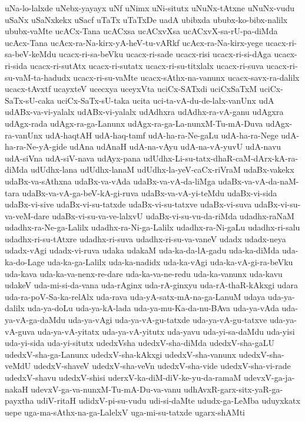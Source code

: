 {uNa-lo-lalxde
uNebx-yayayx
uNf
uNimx
uNi-situtx
uNuNx-tAtxne
uNuNx-vudu
uSaNx
uSaNxkekx
uSacf
uTaTx
uTaTxDe
uadA
ubibxda
ububx-ko-bibx-nalilx
ububx-vaMte
ucACx-Tana
ucACxsa
ucACxvXsa
ucACxvX-sa-rU-pa-diMda
ucAcx-Tana
ucAcx-ra-Na-kirx-yA-heV-tu-vARkf
ucAcx-ra-Na-kirx-yege
ucacx-ri-sa-beV-keMdu
ucacx-ri-sa-beVku
ucacx-ri-sade
ucacx-risi
ucacx-ri-si-dAga
ucacx-ri-sida
ucacx-ri-sutAtx
ucacx-ri-sutatx
ucacx-ri-su-titxlalx
ucacx-ri-suva
ucacx-ri-su-vaM-ta-hadudx
ucacx-ri-su-vaMte
ucacx-sAthx-na-vanunx
ucacx-savx-ra-dalilx
ucacx-tAvxtf
ucayxteV
ucecxya
uceyxVta
uciCx-SATxdi
uciCxSaTxM
uciCx-SaTx-sU-caka
uciCx-SaTx-sU-taka
ucita
uci-ta-vA-du-de-lalx-vanUnx
udA
udABx-va-vi-yalalx
udABx-vi-yalalx
udAdhxra
udAdhx-ra-vA-ganu
udAgxra
udAgx-rada
udAgx-ra-ga-Lanunx
udAgx-ra-ga-La-nunxM-Tu-mA-Duva
udAgx-ra-vanUnx
udA-haqtAH
udA-haq-tamf
udA-ha-ra-Ne-gaLu
udA-ha-ra-Nege
udA-ha-ra-Ne-yA-gide
udAna
udAnaH
udA-na-vAyu
udA-na-vA-yuvU
udA-navu
udA-siVna
udA-siV-nava
udAyx-pana
udUdhx-Li-su-tatx-dhaR-caM-dArx-kA-ra-diMda
udUdhx-lana
udUdhx-lanaM
udUdhx-la-yeV-caCx-riVraM
udaBx-vakekx
udaBx-va-sAthxna
udaBx-va-vAda
udaBx-va-vA-da-liMga
udaBx-va-vA-da-naM-tara
udaBx-va-vA-ga-beV-kA-gi-ruva
udaBx-va-vA-yi-teMdu
udaBx-vi-sida
udaBx-vi-sive
udaBx-vi-su-tatxde
udaBx-vi-su-tatxve
udaBx-vi-suva
udaBx-vi-su-va-veM-dare
udaBx-vi-su-va-ve-lalxvU
udaBx-vi-su-vu-da-riMda
udadhx-raNaM
udadhx-ra-Ne-ga-Lalilx
udadhx-ra-Ni-ga-Lalilx
udadhx-ra-Ni-gaLu
udadhx-ri-salu
udadhx-ri-su-tAtxre
udadhx-ri-suva
udadhx-ri-su-va-vaneV
udadx
udadx-neya
udadx-vAgi
udadx-vi-ruva
udaka
udakaM
uda-ka-da-lA-gadu
uda-ka-diMda
uda-ka-do-Lage
uda-ka-ga-Lalilx
uda-ka-nadidx
uda-ka-vAgi
uda-ka-vA-gi-ra-beVku
uda-kava
uda-ka-va-nenx-re-dare
uda-ka-va-ne-redu
uda-ka-vanunx
uda-kavu
udakeV
uda-mi-si-da-vana
uda-rAginx
uda-rA-ginxyu
uda-rA-thaR-kAkxgi
udara
uda-ra-poV-Sa-ka-relAlx
uda-rava
uda-yA-satx-mA-na-ga-LanuM
udaya
uda-ya-dalilx
uda-ya-doLu
uda-ya-kA-lada
uda-ya-mu-Ka-da-nu-BAva
uda-ya-vAda
uda-ya-vA-ga-daMdu
uda-ya-vAgi
uda-ya-vA-gu-tatxde
uda-ya-vA-gu-tatxve
uda-ya-vA-guva
uda-ya-vA-yitatx
uda-ya-vA-yitutx
uda-yavu
uda-yi-sa-daMdu
uda-yisi
uda-yi-sida
uda-yi-situtx
udedxVsha
udedxV-sha-diMda
udedxV-sha-gaLU
udedxV-sha-ga-Lanunx
udedxV-sha-kAkxgi
udedxV-sha-vanunx
udedxV-sha-veMdU
udedxV-shaveV
udedxV-sha-veVn
udedxV-sha-vide
udedxV-sha-vi-rade
udedxV-shavu
udedxV-shisi
uderxV-ka-diM-diV-ke-yu-da-ramaM
udevxV-ga-ja-nakaH
udevxV-ga-va-nunxM-Tu-mA-Du-va-vanu
udhAvxR-garx-sitx-yaR-ga-payxtha
udiV-ritaH
udidxV-pi-su-vudu
udi-si-daMte
ududx-ga-LeMba
uduyxkatx
uepe
uga-ma-sAthx-na-ga-LalelxV
uga-mi-su-tatxde
ugarx-shAMti
}

